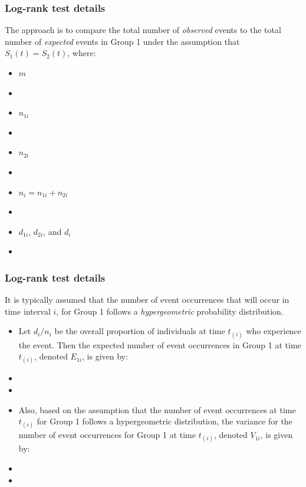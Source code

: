 \begin{frame}
\frametitle{Log-rank test details}
The approach is to compare the total number of \textit{observed} events to the total number of \textit{expected} events in Group 1 under
 the assumption that $S_1(t)=S_2(t)$, where:
\begin{itemize}
\item $m$
\item[]
\item $n_{1i}$
\item[]
\item $n_{2i}$
\item[]
\item $n_i=n_{1i}+n_{2i}$
\item[]
\item $d_{1i}$, $d_{2i}$, and $d_{i}$
\item[]
\end{itemize}
\end{frame}

\begin{frame}
\frametitle{Log-rank test details}
It is typically assumed that the number of event occurrences that will occur in time interval $i$, for Group 1 follows a \textit{hypergeometric} probability distribution.
\begin{itemize}
\item Let $d_i/n_i$ be the overall proportion of individuals at time $t_{(i)}$ who experience the event. Then the expected number of event occurrences in Group 1 at time $t_{(i)}$, denoted
$E_{1i}$, is given by:
\item[]
\item[]
\item Also, based on the assumption that the number of event
 occurrences at time $t_{(i)}$ for Group 1 follows a {hypergeometric} distribution,
the variance for the number of event occurrences for Group 1 at time $t_{(i)}$, denoted ${V}_{1i}$,
is given by:
\item[]
\item[]
\end{itemize}
\end{frame}

